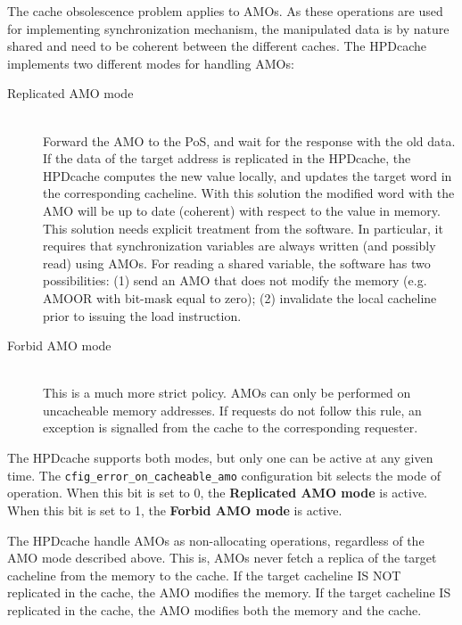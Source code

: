 \documentclass[10pt,titlepage,twoside]{book}
\begin{document}
The cache obsolescence problem applies to \acp{AMO}.
As these operations are used for implementing synchronization mechanism, the manipulated data is by nature shared and need to be coherent between the different caches.
The \ac{HPDcache} implements two different modes for handling \acp{AMO}:

\begin{description}
\item[Replicated AMO mode] \mbox{}\\%
Forward the \ac{AMO} to the \ac{PoS}, and wait for the response with the old data.
If the data of the target address is replicated in the \ac{HPDcache}, the \ac{HPDcache} computes the new value locally, and updates the target word in the corresponding cacheline.
With this solution the modified word with the \ac{AMO} will be up to date (coherent) with respect to the value in memory.
This solution needs explicit treatment from the software.
In particular, it requires that synchronization variables are always written (and possibly read) using \acp{AMO}.
For reading a shared variable, the software has two possibilities: (1) send an \ac{AMO} that does not modify the memory (e.g. AMOOR with bit-mask equal to zero); (2) invalidate the local cacheline prior to issuing the load instruction.

\item[Forbid AMO mode] \mbox{}\\%
This is a much more strict policy.
\acp{AMO} can only be performed on uncacheable memory addresses.
If requests do not follow this rule, an exception is signalled from the cache to the corresponding requester.

\end{description}

The \ac{HPDcache} supports both modes, but only one can be active at any given time.
The \verb$cfig_error_on_cacheable_amo$ configuration bit selects the mode of operation.
When this bit is set to 0, the \textbf{Replicated AMO mode} is active.
When this bit is set to 1, the \textbf{Forbid AMO mode} is active.

The \ac{HPDcache} handle \acp{AMO} as non-allocating operations, regardless of the \ac{AMO} mode described above.
This is, \acp{AMO} never fetch a replica of the target cacheline from the memory to the cache.
If the target cacheline IS NOT replicated in the cache, the \ac{AMO} modifies the memory.
If the target cacheline IS replicated in the cache, the \ac{AMO} modifies both the memory and the cache.
\end{document}
